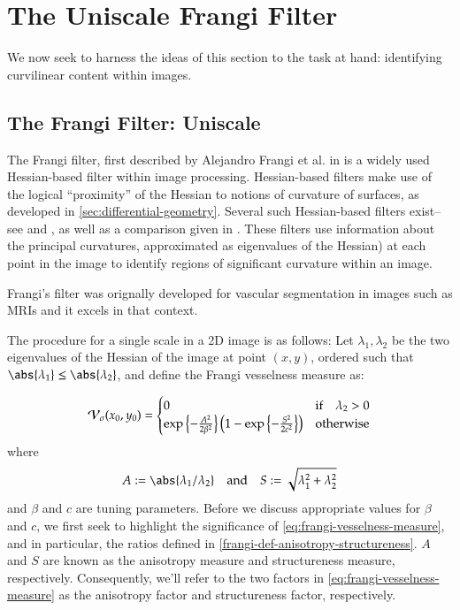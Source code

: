 \chapter{The Uniscale Frangi Filter} \label{ch:unifrangi}

	We now seek to harness the ideas of this section to the task at hand: identifying curvilinear content within images.
\section{The Frangi Filter: Uniscale} \label{sec:frangi}

The Frangi filter, first described by Alejandro Frangi et al. in \cite{frangi-paper} is a widely used  Hessian-based filter
within image processing. Hessian-based filters make use of the
logical ``proximity'' of the Hessian to notions of curvature of surfaces,
as developed in \cref{sec:differential-geometry}. 
Several such Hessian-based filters exist--see \cite{sato-filter} and \cite{lorenz-filter}, as well as a comparison given in \cite{olabarriaga-hessian-comparison}. These filters use information about the principal curvatures, approximated as eigenvalues of the Hessian) at each point in the image
to identify regions of significant curvature within an image.


Frangi's filter was orignally developed for vascular segmentation in images such as MRIs and it excels in that context.

The procedure for a single scale in a 2D image is as follows:
Let $\lambda_1, \lambda_2$ be the two eigenvalues of the Hessian of the image at point $(x, y)$,
ordered such that $\abs{\lambda_1} \leq \abs{\lambda_2}$, and define the Frangi vesselness measure %
as:

\begin{equation} \label{eq:frangi-vesselness-measure}
\mathcal{V}_{\sigma}(x_0,y_0) = \begin{cases}
0 & \text{if} \quad \lambda_2 > 0 \\
\exp\left\{-\frac{A^2}{2\beta^2}\right\}
\left(1 - \exp\left\{-\frac{S^2}{2c^2}\right\}\right) & \text{otherwise}
\end{cases} \end{equation}
where
\begin{equation} \label{frangi-def-anisotropy-structureness}
A := \abs{\lambda_1 / \lambda_2}
\quad \textrm{and} \quad 
S := \sqrt{\lambda_1^2 + \lambda_2^2}
\end{equation}
and $\beta$ and $c$ are tuning parameters. Before we discuss appropriate values for $\beta$ and $c$, we first seek to highlight the significance of \cref{eq:frangi-vesselness-measure}, and in particular, the ratios defined in
\cref{frangi-def-anisotropy-structureness}. $A$ and $S$ are known as the anisotropy measure and structureness measure, respectively. Consequently, we'll refer to the two factors in \cref{eq:frangi-vesselness-measure} as the anisotropy factor and structureness factor, respectively. 

